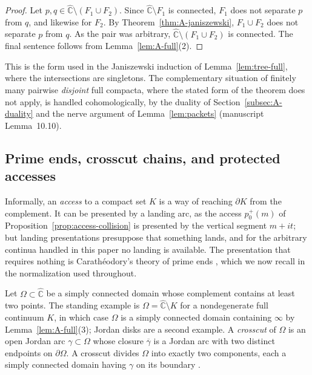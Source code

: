 \documentclass[11pt,reqno]{amsart}
\theoremstyle{definition}
\theoremstyle{remark}
\newcommand{\Chat}{\widehat{\mathbb C}}
\begin{document}
\begin{proof}
Let $p,q\in\Chat\setminus(F_1\cup F_2)$.  Since $\Chat\setminus F_1$ is
connected, $F_1$ does not separate $p$ from $q$, and likewise for $F_2$.
By Theorem~\ref{thm:A-janiszewski}, $F_1\cup F_2$ does not separate $p$
from $q$.  As the pair was arbitrary, $\Chat\setminus(F_1\cup F_2)$ is
connected.  The final sentence follows from Lemma~\ref{lem:A-full}(2).
\end{proof}

This is the form used in the Janiszewski induction of
Lemma~\ref{lem:tree-full}, where the intersections are singletons.  The
complementary situation of finitely many pairwise \emph{disjoint} full
compacta, where the stated form of the theorem does not apply, is handled
cohomologically, by the duality of Section~\ref{subsec:A-duality} and the
nerve argument of Lemma~\ref{lem:packets} (manuscript Lemma~10.10).

\subsection{Prime ends, crosscut chains, and protected accesses}
\label{subsec:A-primeends}

Informally, an \emph{access} to a compact set $K$ is a way of reaching
$\partial K$ from the complement.  It can be presented by a landing arc,
as the access $p_0^{+}(m)$ of Proposition~\ref{prop:access-collision} is
presented by the vertical segment $m+it$; but landing presentations
presuppose that something lands, and for the arbitrary continua handled in
this paper no landing is available.  The presentation that requires
nothing is Carath\'eodory's theory of prime ends \cite{Pom92}, which we
now recall in the normalization used throughout.

Let $\Omega\subset\Chat$ be a simply connected domain whose complement
contains at least two points.  The standing example is
$\Omega=\Chat\setminus K$ for a nondegenerate full continuum $K$, in which
case $\Omega$ is a simply connected domain containing $\infty$ by
Lemma~\ref{lem:A-full}(3); Jordan disks are a second example.  A
\emph{crosscut} of $\Omega$ is an open Jordan arc $\gamma\subset\Omega$
whose closure $\overline{\gamma}$ is a Jordan arc with two distinct
endpoints on $\partial\Omega$.  A crosscut divides $\Omega$ into exactly
two components, each a simply connected domain having $\gamma$ on its
boundary \cite{Pom92}.
\end{document}
